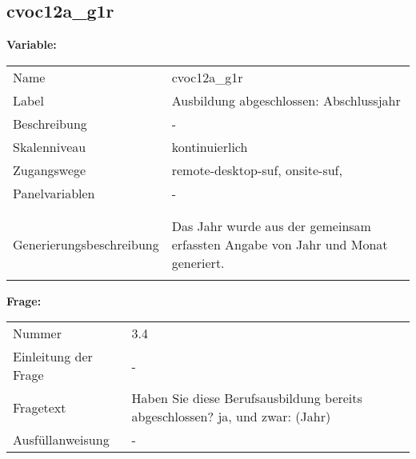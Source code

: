 	
	
	\subsection{cvoc12a\_g1r}
	\label{subSection:cvoc12a_g1r}

	\noindent\textbf{Variable:}\\
		\begin{tabular}{lL{11.3cm}}
			\label{tableVariable:cvoc12a_g1r}
			Name & cvoc12a\_g1r \\
			Label & Ausbildung abgeschlossen: Abschlussjahr \\
			Beschreibung & - \\
			Skalenniveau & kontinuierlich \\
			Zugangswege &
				remote-desktop-suf,
				onsite-suf,
 \\
			Panelvariablen & -
			 \\
			 \\
 \\
					Generierungsbeschreibung & Das Jahr wurde aus der gemeinsam erfassten Angabe von Jahr und Monat generiert. 
				 \\	
			 \\
		\end{tabular}

		\vspace*{1 cm}
		\noindent\textbf{Frage:}\\
		\begin{tabular}{lL{11.3cm}}
			\label{tableQuestion:cvoc12a_g1r}
			Nummer & 3.4 \\
			Einleitung der Frage & - \\
			Fragetext & Haben Sie diese Berufsausbildung bereits abgeschlossen?
ja, und zwar:
(Jahr) \\
			Ausfüllanweisung & - \\
		\end{tabular}




